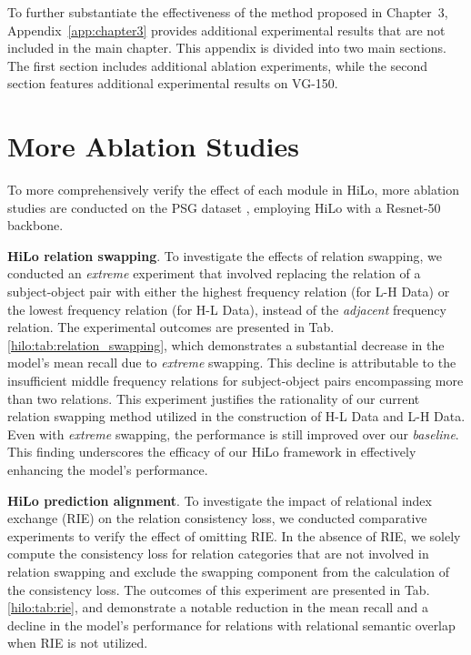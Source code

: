 To further substantiate the effectiveness of the method proposed in Chapter~3, Appendix~\ref{app:chapter3} provides additional experimental results that are not included in the main chapter.
This appendix is divided into two main sections.
The first section includes additional ablation experiments, while the second section features additional experimental results on VG-150.

\section{More Ablation Studies}
To more comprehensively verify the effect of each module in HiLo, more ablation studies are conducted on the PSG dataset \citep{yang2022panoptic}, employing HiLo with a Resnet-50 \citep{he2016deep} backbone.

\textbf{HiLo relation swapping}.
To investigate the effects of relation swapping, we conducted an \emph{extreme} experiment that involved replacing the relation of a subject-object pair with either the highest frequency relation (for L-H Data) or the lowest frequency relation (for H-L Data), instead of the \emph{adjacent} frequency relation.
The experimental outcomes are presented in Tab. \ref{hilo:tab:relation_swapping}, which demonstrates a substantial decrease in the model's mean recall due to \emph{extreme} swapping.
This decline is attributable to the insufficient middle frequency relations for subject-object pairs encompassing more than two relations.
This experiment justifies the rationality of our current relation swapping method utilized in the construction of H-L Data and L-H Data.
Even with \emph{extreme} swapping, the performance is still improved over our \emph{baseline}.
This finding underscores the efficacy of our HiLo framework in effectively enhancing the model's performance.

\textbf{HiLo prediction alignment}.
To investigate the impact of relational index exchange (RIE) on the relation consistency loss, we conducted comparative experiments to verify the effect of omitting RIE.
In the absence of RIE, we solely compute the consistency loss for relation categories that are not involved in relation swapping and exclude the swapping component from the calculation of the consistency loss.
The outcomes of this experiment are presented in Tab. \ref{hilo:tab:rie}, and demonstrate a notable reduction in the mean recall and a decline in the model's performance for relations with relational semantic overlap when RIE is not utilized.


